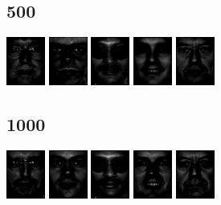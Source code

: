 \documentclass{article}
\begin{document}
\subsection{500}
\includegraphics{imgs/k500/out0.png}
\includegraphics{imgs/k500/out1.png}
\includegraphics{imgs/k500/out2.png}
\includegraphics{imgs/k500/out3.png}
\includegraphics{imgs/k500/out4.png}
\subsection{1000}
\includegraphics{imgs/k1000/out0.png}
\includegraphics{imgs/k1000/out1.png}
\includegraphics{imgs/k1000/out2.png}
\includegraphics{imgs/k1000/out3.png}
\includegraphics{imgs/k1000/out4.png}
\end{document}

